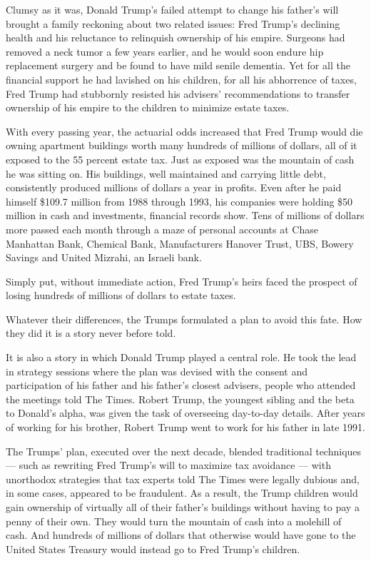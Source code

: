 Clumsy as it was, Donald Trump's failed attempt to change his father's
will brought a family reckoning about two related issues: Fred Trump's
declining health and his reluctance to relinquish ownership of his
empire. Surgeons had removed a neck tumor a few years earlier, and he
would soon endure hip replacement surgery and be found to have mild
senile dementia. Yet for all the financial support he had lavished on
his children, for all his abhorrence of taxes, Fred Trump had stubbornly
resisted his advisers' recommendations to transfer ownership of his
empire to the children to minimize estate taxes.

With every passing year, the actuarial odds increased that Fred Trump
would die owning apartment buildings worth many hundreds of millions of
dollars, all of it exposed to the 55 percent estate tax. Just as exposed
was the mountain of cash he was sitting on. His buildings, well
maintained and carrying little debt, consistently produced millions of
dollars a year in profits. Even after he paid himself \$109.7 million
from 1988 through 1993, his companies were holding \$50 million in cash
and investments, financial records show. Tens of millions of dollars
more passed each month through a maze of personal accounts at Chase
Manhattan Bank, Chemical Bank, Manufacturers Hanover Trust, UBS, Bowery
Savings and United Mizrahi, an Israeli bank.

Simply put, without immediate action, Fred Trump's heirs faced the
prospect of losing hundreds of millions of dollars to estate taxes.

Whatever their differences, the Trumps formulated a plan to avoid this
fate. How they did it is a story never before told.

It is also a story in which Donald Trump played a central role. He took
the lead in strategy sessions where the plan was devised with the
consent and participation of his father and his father's closest
advisers, people who attended the meetings told The Times. Robert Trump,
the youngest sibling and the beta to Donald's alpha, was given the task
of overseeing day-to-day details. After years of working for his
brother, Robert Trump went to work for his father in late 1991.

The Trumps' plan, executed over the next decade, blended traditional
techniques --- such as rewriting Fred Trump's will to maximize tax
avoidance --- with unorthodox strategies that tax experts told The Times
were legally dubious and, in some cases, appeared to be fraudulent. As a
result, the Trump children would gain ownership of virtually all of
their father's buildings without having to pay a penny of their own.
They would turn the mountain of cash into a molehill of cash. And
hundreds of millions of dollars that otherwise would have gone to the
United States Treasury would instead go to Fred Trump's children.

